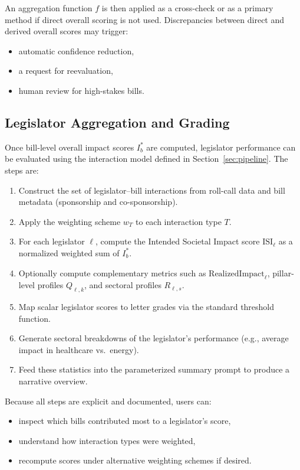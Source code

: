 \documentclass[12pt]{article}
\begin{document}
An aggregation function \(f\) is then applied as a cross-check or as a primary method if direct overall scoring is not
used. Discrepancies between direct and derived overall scores may trigger:

\begin{itemize}
    \item automatic confidence reduction,
    \item a request for reevaluation,
    \item human review for high-stakes bills.
\end{itemize}

\subsection{Legislator Aggregation and Grading}

Once bill-level overall impact scores \(I_b^{\ast}\) are computed, legislator performance can be evaluated using the
interaction model defined in Section~\ref{sec:pipeline}. The steps are:

\begin{enumerate}
    \item Construct the set of legislator--bill interactions from roll-call data and bill metadata (sponsorship and
    co-sponsorship).
    \item Apply the weighting scheme \(w_T\) to each interaction type \(T\).
    \item For each legislator \(\ell\), compute the Intended Societal Impact score \(\text{ISI}_{\ell}\) as a normalized
    weighted sum of \(I_b^{\ast}\).
    \item Optionally compute complementary metrics such as \(\text{RealizedImpact}_{\ell}\), pillar-level profiles
    \(Q_{\ell,k}\), and sectoral profiles \(R_{\ell,s}\).
    \item Map scalar legislator scores to letter grades via the standard threshold function.
    \item Generate sectoral breakdowns of the legislator's performance (e.g., average impact in healthcare vs.\ energy).
    \item Feed these statistics into the parameterized summary prompt to produce a narrative overview.
\end{enumerate}

Because all steps are explicit and documented, users can:

\begin{itemize}
    \item inspect which bills contributed most to a legislator's score,
    \item understand how interaction types were weighted,
    \item recompute scores under alternative weighting schemes if desired.
\end{itemize}
\end{document}
